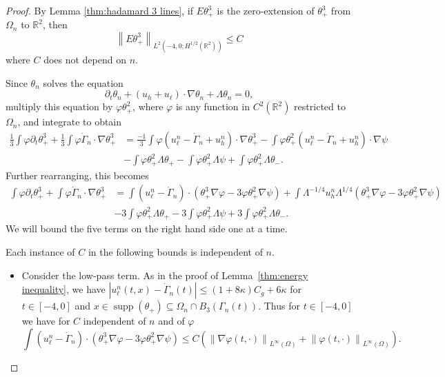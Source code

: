 \documentclass[11pt]{amsart}
\theoremstyle{remark}
\theoremstyle{definition}
\newcommand{\R}{\mathbb{R}}
\newcommand{\norm}[1]{\left\lVert#1\right\rVert}
\newcommand{\paren}[1]{\left( #1 \right)}
\DeclareMathOperator{\supp}{supp}
\newcommand{\del}{\partial}
\newcommand{\grad}{\nabla}
\newcommand{\ulow}{u_\ell}
\newcommand{\uhigh}{u_h}
\newcommand{\Cgamma}{C_g}
\begin{document}
\begin{proof}
By Lemma \ref{thm:hadamard 3 lines}, if $E \theta_+^3$ is the zero-extension of $\theta_+^3$ from $\Omega_n$ to $\R^2$, then
\begin{equation} \label{theta3 compact in space} \norm{ E \theta_+^3}_{L^2(-4,0; H^{1/2}(\R^2))} \leq C \end{equation}
where $C$ does not depend on $n$.  

Since $\theta_n$ solves the equation
\[ \del_t \theta_n + (\uhigh + \ulow)\cdot \grad \theta_n + \Lambda \theta_n = 0, \] 
multiply this equation by $\varphi \theta_+^2$, where $\varphi$ is any function in $C^2(\R^2)$ restricted to $\Omega_n$, and integrate to obtain
\begin{align*} 
\frac{1}{3} \int \varphi \del_t \theta_+^3 + \frac{1}{3} \int \varphi \dot{\Gamma}_n \cdot \grad \theta_+^3 &= \frac{-1}{3} \int \varphi (\ulow^n - \dot{\Gamma}_n + \uhigh^n) \cdot \grad \theta_+^3 - \int \varphi \theta_+^2 (\ulow^n - \dot{\Gamma}_n + \uhigh^n) \cdot \grad \psi 
\\ & - \int \varphi \theta_+^2 \Lambda \theta_+ - \int \varphi \theta_+^2 \Lambda \psi + \int \varphi \theta_+^2 \Lambda \theta_-. 
\end{align*}
Further rearranging, this becomes
\begin{align*} 
\int \varphi \del_t \theta_+^3 + \int \varphi \dot{\Gamma}_n \cdot \grad \theta_+^3 
&= \int (\ulow^n - \dot{\Gamma}_n) \cdot (\theta_+^3 \grad\varphi - 3 \varphi \theta_+^2 \grad\psi) + \int \Lambda^{-1/4} \uhigh^n \Lambda^{1/4} \paren{\theta_+^3 \grad\varphi - 3 \varphi \theta_+^2 \grad\psi}
\\ & - 3\int \varphi \theta_+^2 \Lambda \theta_+ - 3\int \varphi \theta_+^2 \Lambda \psi + 3\int \varphi \theta_+^2 \Lambda \theta_-. 
\end{align*}
We will bound the five terms on the right hand side one at a time.  

Each instance of $C$ in the following bounds is independent of $n$.  

\begin{itemize}
\item Consider the low-pass term.  As in the proof of Lemma~\ref{thm:energy inequality}, we have $|\ulow^n(t,x) - \dot{\Gamma}_n(t)| \leq (1+8\kappa)\Cgamma + 6 \kappa$ for $t \in [-4,0]$ and $x \in \supp(\theta_+) \subseteq \Omega_n \cap B_3(\Gamma_n(t))$.  Thus for $t \in [-4,0]$ we have for $C$ independent of $n$ and of $\varphi$
\[ \int (\ulow^n - \dot{\Gamma}_n) \cdot (\theta_+^3 \grad\varphi - 3 \varphi \theta_+^2 \grad\psi) \leq C \paren{\norm{\grad\varphi(t,\cdot)}_{L^\infty(\Omega)} + \norm{\varphi(t,\cdot)}_{L^\infty(\Omega)}}. \]


\end{itemize}
\end{proof}
\end{document}
